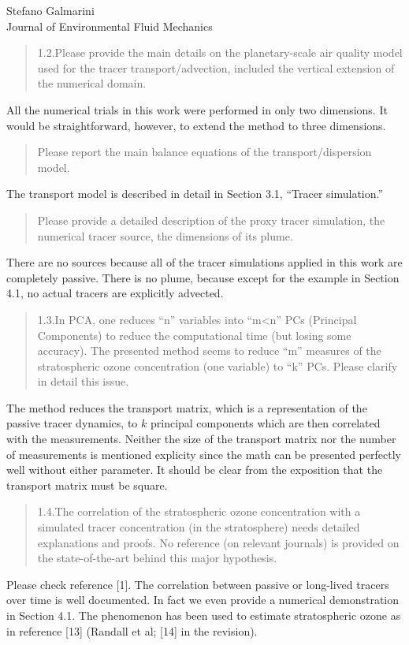 \documentclass{letter}
\begin{document}
\begin{letter}{Stefano Galmarini\\
Journal of Environmental Fluid Mechanics}
\begin{quote}
1.2.Please provide the main details on the planetary-scale air quality model used for the tracer transport/advection, included the vertical extension of the numerical domain.
\end{quote}
All the numerical trials in this work were performed in only two dimensions.
It would be straightforward, however, to extend the method to three dimensions.
\begin{quote}
Please report the main balance equations of the transport/dispersion model.
\end{quote}
The transport model is described in detail in Section 3.1, ``Tracer simulation.''
\begin{quote}
Please provide a detailed description of the proxy tracer simulation, the numerical tracer source, the dimensions of its plume.
\end{quote}
There are no sources because all of the tracer simulations applied in this
work are completely passive. There is no plume, because except for the example
in Section 4.1, no actual tracers are explicitly advected.
\begin{quote}
1.3.In PCA, one reduces ``n'' variables into ``m\textless n'' PCs (Principal Components) to reduce the computational time (but losing some accuracy). The presented method seems to reduce ``m'' measures of the stratospheric ozone concentration (one variable) to ``k'' PCs. Please clarify in detail this issue.
\end{quote}
The method reduces the transport matrix, which is a representation of the passive
tracer dynamics, to $k$ principal components which are then correlated with the
measurements.
Neither the size of the transport matrix nor the number of measurements is
mentioned explicity since the math can be presented perfectly well without 
either parameter.
It should be clear from the exposition that the transport matrix must be square.
\begin{quote}
1.4.The correlation of the stratospheric ozone concentration with a simulated tracer concentration (in the stratosphere) needs detailed explanations and proofs. No reference (on relevant journals) is provided on the state-of-the-art behind this major hypothesis.
\end{quote}
Please check reference [1]. The correlation between passive or long-lived tracers over time is well documented. In fact we even provide a numerical demonstration in Section 4.1. The phenomenon has been used to estimate stratospheric ozone as in reference [13] (Randall et al; [14] in the revision).

\end{letter}
\end{document}
